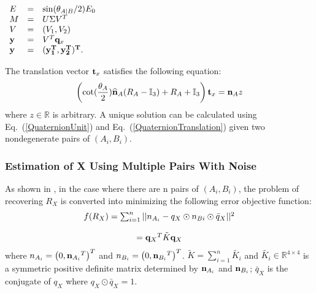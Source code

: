 \documentclass[twocolumn,10pt]{asme2ej}
\newcommand{\nn}{{\bf n}}
\newcommand{\ttt}{{\bf t}}
\newcommand{\qq}{{\bf q}}
\begin{document}
\begin{center}
$\begin{array}{lcl}
E & = & \sin(\theta_{A|B}/2)E_0\\
M & = & U\Sigma V^{T}\\
V & = & (V_{1}, V_{2})\\
\bf y & = & V^{T}\qq_{x}\\
\bf y & = & (\bf y^{T}_{1},\bf y^{T}_{2} )^{T}.
\end{array}$
\end{center}
The translation vector $\ttt_{x}$ satisfies the following equation:
\begin{equation}
\left(\cot(\dfrac{\theta_{A}}{2})\widehat{\nn}_{A}(R_{A}-\mathbb{I}_{3})+ R_{A} + \mathbb{I}_{3}\right)\ttt_{x} = \nn_{A}z
\label{QuaternionTranslation} 
\end{equation}
where $z \in \mathbb{R}$ is arbitrary. A unique solution can be calculated using Eq.~(\ref{QuaternionUnit}) and Eq.~(\ref{QuaternionTranslation}) given two nondegenerate pairs of $(A_{i}, B_{i})$.

\subsubsection{Estimation of X Using Multiple Pairs With Noise}
As shown in \cite{horaud1995hand}, in the case where there are n pairs of $(A_{i}, B_{i})$, the problem of recovering $R_{X}$ is converted into minimizing the following error objective function:
\begin{equation}
\begin{array}{c}
f(R_{X})
= \sum_{i = 1}^{n}||{n_{A_{i}} - q_{X} \odot n_{B{i}} \odot \bar{q}_{X}}||^{2} \\
\\ 
= {\qq_{X}}^{T}\tilde{K}{\qq_{X}}
\end{array}
\label{ErrorQuaternion} 
\end{equation}
where $n_{A_{i}} = \left(0, {\nn_{A_{i}}}^{T}\right)^{T}$ and $n_{B_{i}} = \left(0, {\nn_{B_{i}}}^{T}\right)^{T}$. $\tilde{K} = \sum_{i = 1}^{n}\tilde{K_{i}}$ and $\tilde{K_{i}} \in \mathbb{R}^{4 \times 4}$ is a symmetric positive definite matrix determined by $\nn_{A_{i}}$ and $\nn_{B_{i}}$; $\bar{q}_{X}$ is the conjugate of ${q}_{X}$ where $q_{X} \odot \bar{q}_{X} = 1$.
\end{document}
